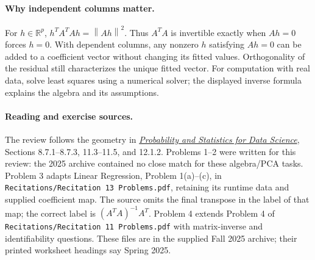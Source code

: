 \documentclass[11pt]{article}
\newcommand{\R}{\mathbb R}
\newcommand{\norm}[1]{\left\lVert#1\right\rVert}
\begin{document}
\paragraph{Why independent columns matter.}
For $h\in\R^p$, $h^TA^TAh=\norm{Ah}^2$. Thus $A^TA$ is invertible
exactly when $Ah=0$ forces $h=0$. With dependent columns, any nonzero
$h$ satisfying $Ah=0$ can be added to a coefficient vector without
changing its fitted values. Orthogonality of the residual still
characterizes the unique fitted vector. For computation with real data,
solve least squares using a numerical solver; the displayed inverse
formula explains the algebra and its assumptions.

\paragraph{Reading and exercise sources.}
The review follows the geometry in
\href{https://github.com/cfgranda/ps4ds/blob/main/ps4ds_preprint.pdf}
{\emph{Probability and Statistics for Data Science}}, Sections 8.7.1--8.7.3,
11.3--11.5, and 12.1.2. Problems 1--2 were written for this review:
the 2025 archive contained no close match for these algebra/PCA tasks.
Problem 3 adapts Linear Regression, Problem 1(a)--(c), in
\texttt{Recitations/Recitation 13 Problems.pdf}, retaining its runtime
data and supplied coefficient map. The source omits the final transpose
in the label of that map; the correct label is $(A^TA)^{-1}A^T$.
Problem 4 extends Problem 4 of
\texttt{Recitations/Recitation 11 Problems.pdf} with matrix-inverse and
identifiability questions. These files are in the supplied Fall 2025
archive; their printed worksheet headings say Spring 2025.
\fi
\end{document}
